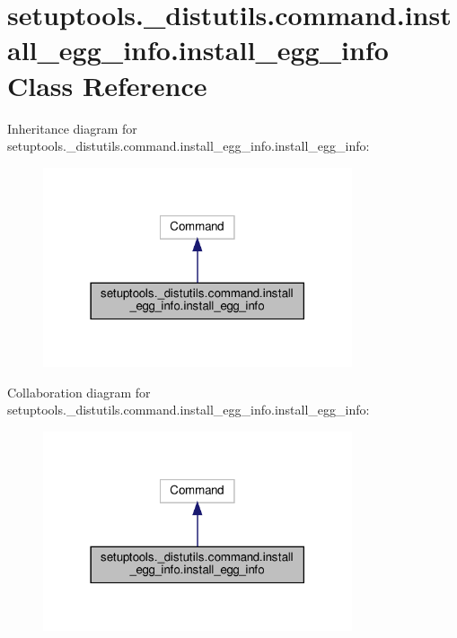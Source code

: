 \hypertarget{classsetuptools_1_1__distutils_1_1command_1_1install__egg__info_1_1install__egg__info}{}\section{setuptools.\+\_\+distutils.\+command.\+install\+\_\+egg\+\_\+info.\+install\+\_\+egg\+\_\+info Class Reference}
\label{classsetuptools_1_1__distutils_1_1command_1_1install__egg__info_1_1install__egg__info}


Inheritance diagram for setuptools.\+\_\+distutils.\+command.\+install\+\_\+egg\+\_\+info.\+install\+\_\+egg\+\_\+info\+:
\nopagebreak
\begin{figure}[H]
\begin{center}
\leavevmode
\includegraphics[width=258pt]{classsetuptools_1_1__distutils_1_1command_1_1install__egg__info_1_1install__egg__info__inherit__graph}
\end{center}
\end{figure}


Collaboration diagram for setuptools.\+\_\+distutils.\+command.\+install\+\_\+egg\+\_\+info.\+install\+\_\+egg\+\_\+info\+:
\nopagebreak
\begin{figure}[H]
\begin{center}
\leavevmode
\includegraphics[width=258pt]{classsetuptools_1_1__distutils_1_1command_1_1install__egg__info_1_1install__egg__info__coll__graph}
\end{center}
\end{figure}

